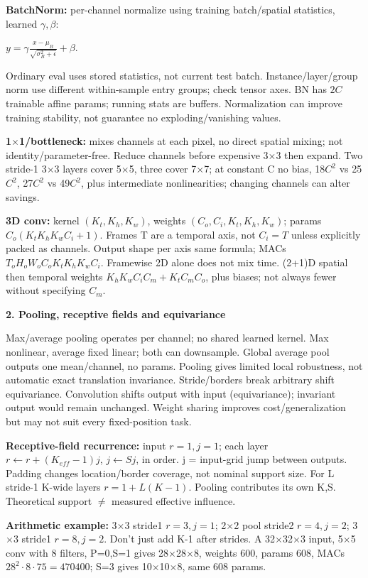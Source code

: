 \documentclass[a4paper]{article}
\newcommand{\key}[1]{\textbf{#1}}
\newcommand{\Topic}[1]{\par\vspace{1.7pt}\noindent
  {\fontsize{7.7}{8.0}\selectfont\bfseries #1}\par\vspace{0.3pt}}
\newcommand{\eq}[1]{\par\noindent\mbox{\(\displaystyle #1\)}\par}
\newcounter{sheet}
\newcounter{sheetcolumn}
\newlength{\colwidth}
\newenvironment{sheetcol}[1][7.0]{\stepcounter{sheetcolumn}
  \begin{lrbox}{\columnbox}\begin{minipage}[t]{\colwidth}\vspace{0pt}
  \fontsize{#1}{\dimexpr#1pt+0.6pt\relax}\selectfont}
  {\end{minipage}\end{lrbox}
  \typeout{CV1COL|\thesheet|\thesheetcolumn|\the\dimexpr\ht\columnbox+\dp\columnbox\relax}
  \usebox{\columnbox}\ignorespacesafterend}
\begin{document}
\begin{sheetcol}
\key{BatchNorm:} per-channel normalize using training batch/spatial statistics, learned \(\gamma,\beta\):
\eq{y=\gamma\frac{x-\mu_B}{\sqrt{\sigma_B^2+\epsilon}}+\beta.}
Ordinary eval uses stored statistics, not current test batch. Instance/layer/group norm use different within-sample entry groups; check tensor axes. BN has \(2C\) trainable affine params; running stats are buffers. Normalization can improve training stability, not guarantee no exploding/vanishing values.

\key{1\(\times\)1/bottleneck:} mixes channels at each pixel, no direct spatial mixing; not identity/parameter-free. Reduce channels before expensive 3\(\times\)3 then expand. Two stride-1 3\(\times\)3 layers cover 5\(\times\)5, three cover 7\(\times\)7; at constant C no bias, 18\(C^2\) vs 25\(C^2\), 27\(C^2\) vs 49\(C^2\), plus intermediate nonlinearities; changing channels can alter savings.

\key{3D conv:} kernel \((K_t,K_h,K_w)\), weights \((C_o,C_i,K_t,K_h,K_w)\); params \(C_o(K_tK_hK_wC_i+1)\). Frames T are a temporal axis, not \(C_i=T\) unless explicitly packed as channels. Output shape per axis same formula; MACs \(T_oH_oW_oC_oK_tK_hK_wC_i\). Framewise 2D alone does not mix time. (2+1)D spatial then temporal weights \(K_hK_wC_iC_m+K_tC_mC_o\), plus biases; not always fewer without specifying \(C_m\).

\Topic{2. Pooling, receptive fields and equivariance}
Max/average pooling operates per channel; no shared learned kernel. Max nonlinear, average fixed linear; both can downsample. Global average pool outputs one mean/channel, no params. Pooling gives limited local robustness, not automatic exact translation invariance. Stride/borders break arbitrary shift equivariance. Convolution shifts output with input (equivariance); invariant output would remain unchanged. Weight sharing improves cost/generalization but may not suit every fixed-position task.

\key{Receptive-field recurrence:} input \(r=1,j=1\); each layer \(r\leftarrow r+(K_{eff}-1)j\), \(j\leftarrow Sj\), in order. j = input-grid jump between outputs. Padding changes location/border coverage, not nominal support size. For L stride-1 K-wide layers \(r=1+L(K-1)\). Pooling contributes its own K,S. Theoretical support \(\ne\) measured effective influence.

\key{Arithmetic example:} 3\(\times\)3 stride1 \(r=3,j=1\); 2\(\times\)2 pool stride2 \(r=4,j=2\); 3\(\times\)3 stride1 \(r=8,j=2\). Don't just add K-1 after strides. A 32\(\times\)32\(\times\)3 input, 5\(\times\)5 conv with 8 filters, P=0,S=1 gives 28\(\times\)28\(\times\)8, weights 600, params 608, MACs \(28^2\cdot8\cdot75=470400\); S=3 gives 10\(\times\)10\(\times\)8, same 608 params.


\end{sheetcol}
\end{document}
